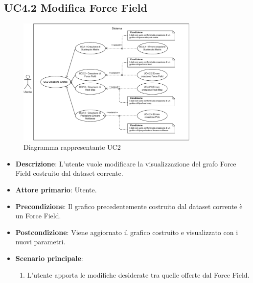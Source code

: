 \subsection{UC4.2 Modifica Force Field}
\label{subsec:uc4.2}
\begin{figure}[h]
    \centering
    \includegraphics[width=0.8\textwidth]{componenti/casi-duso/diagrammi/UC2.pdf}
    \caption{Diagramma rappresentante UC2}
    \label{fig:UC2}
\end{figure}


\begin{itemize}
    \item \textbf{Descrizione}: L’utente vuole modificare la visualizzazione del grafo Force Field
                                costruito dal dataset corrente.
	
    \item \textbf{Attore primario}: Utente.
    
    \item \textbf{Precondizione}:   Il grafico precedentemente costruito dal dataset corrente è un Force Field.

    \item \textbf{Postcondizione}:  Viene aggiornato il grafico costruito e visualizzato con i nuovi parametri.

	\item \textbf{Scenario principale}:
		\begin{enumerate}
            \item L'utente apporta le modifiche desiderate tra quelle offerte dal Force Field.
        \end{enumerate}
\end{itemize}


